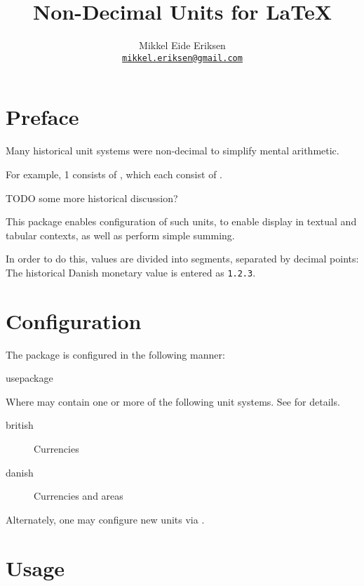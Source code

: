 \documentclass{article}
\title{Non-Decimal Units for \LaTeX}
\author{Mikkel Eide Eriksen\\\href{mailto:mikkel.eriksen@gmail.com}{\texttt{mikkel.eriksen@gmail.com}}}
\begin{document}
\maketitle

\section{Preface} %

Many historical unit systems were non-decimal to simplify mental arithmetic.

For example, 1  consists of  , which each consist of  .

TODO some more historical discussion?

This package enables configuration of such units, to enable display in textual and tabular contexts, as well as perform simple summing.

In order to do this, values are divided into segments, separated by decimal points: The historical Danish monetary value  is entered as \texttt{1.2.3}.

\section{Configuration} %

The package is configured in the following manner:

\begin{docCommand}
	{usepackage}
	{}

Where  may contain one or more of the following unit systems. See  for details.

\begin{description}
\item[british] Currencies
\item[danish] Currencies and areas
\end{description}

Alternately, one may configure new units via .

\end{docCommand}

\clearpage
\section{Usage} %
\end{document}
